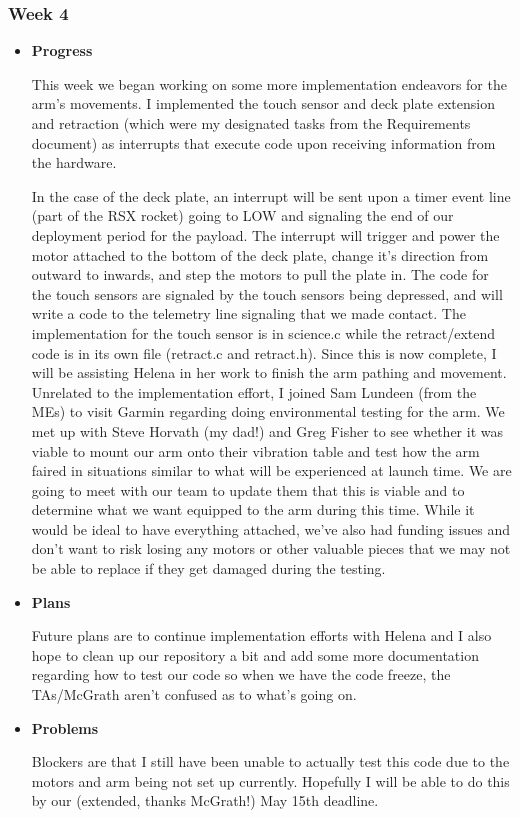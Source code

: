 \subsubsection{Week 4}
\begin{itemize}
	\item{
		\textbf{Progress}


		This week we began working on some more implementation endeavors for the arm's movements. 
		I implemented the touch sensor and deck plate extension and retraction (which were my designated tasks from the 
		Requirements document) as interrupts that execute code upon receiving information from the hardware. 
		
		In the case of the deck plate, an interrupt will be sent upon a timer event line (part of the RSX rocket) going to 
		LOW and signaling the end of our deployment period for the payload. The interrupt will trigger and power the motor 
		attached to the bottom of the deck plate, change it's direction from outward to inwards, and step the motors to 
		pull the plate in. The code for the touch sensors are signaled by the touch sensors being depressed, and will 
		write a code to the telemetry line signaling that we made contact. The implementation for the touch sensor is in 
		science.c while the retract/extend code is in its own file (retract.c and retract.h). Since this is now complete, 
		I will be assisting Helena in her work to finish the arm pathing and movement. Unrelated to the implementation 
		effort, I joined Sam Lundeen (from the MEs) to visit Garmin regarding doing environmental testing for the arm. We 
		met up with Steve Horvath (my dad!) and Greg Fisher to see whether it was viable to mount our arm onto their 
		vibration table and test how the arm faired in situations similar to what will be experienced at launch time. We 
		are going to meet with our team to update them that this is viable and to determine what we want equipped to the 
		arm during this time. While it would be ideal to have everything attached, we've also had funding issues and don't 
		want to risk losing any motors or other valuable pieces that we may not be able to replace if they get damaged 
		during the testing.
	}
	\item{
		\textbf{Plans}


		Future plans are to continue implementation efforts with Helena and I also hope to clean up our repository a bit 
		and add some more documentation regarding how to test our code so when we have the code freeze, the TAs/McGrath 
		aren't confused as to what's going on.
	}
	\item{
		\textbf{Problems}


		Blockers are that I still have been unable to actually test this code due to the motors and arm being not set up 
		currently. Hopefully I will be able to do this by our (extended, thanks McGrath!) May 15th deadline.
	}
\end{itemize}

